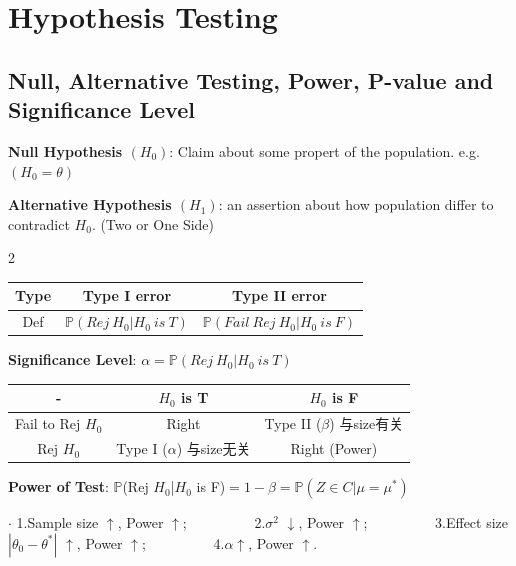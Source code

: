 \documentclass[9pt]{article}
\begin{document}
\section{Hypothesis Testing} %
\subsection{Null, Alternative Testing, Power, P-value and Significance Level}

\textbf{Null Hypothesis $(H_0)$}: Claim about some propert of the population. e.g. $(H_0=\theta)$

\textbf{Alternative Hypothesis $(H_1)$}: an assertion about how population differ to contradict $H_0$. (Two or One Side)

\vspace{-0.4cm}
\begin{multicols}{2}
    \begin{tabular}{|c|c|c|}
        \hline
        Type & Type I error                         & Type II error                               \\
        \hline
        Def  & $\mathbb{P}(Rej \ H_0|H_0 \ is \ T)$ & $\mathbb{P}(Fail \ Rej \ H_0|H_0 \ is \ F)$ \\
        \hline
    \end{tabular}

    \textbf{Significance Level}: $\alpha = \mathbb{P}(Rej \ H_0|H_0 \ is \ T)$

    \columnbreak

    \begin{tabular}{|c|c|c|}
        \hline
        -                 & $H_0$ is T                                 & $H_0$ is F                                \\
        \hline
        Fail to Rej $H_0$ & Right                                      & {\footnotesize Type II ($\beta$) 与size有关} \\
        \hline
        Rej $H_0$         & {\footnotesize Type I ($\alpha $) 与size无关} & Right (Power)                             \\
        \hline
    \end{tabular}

\end{multicols}
\vspace{-0.4cm}

\textbf{Power of Test}: $\mathbb{P}$(Rej $H_0$|$H_0$ is F)$=1-\beta=\mathbb{P}(Z\in C|\mu=\mu^*)$

$\cdot$ 1.Sample size $\uparrow$, Power $\uparrow$; \ \ \ \ \ \ \ \ \ 2.$\sigma^2$ $\downarrow$, Power $\uparrow$; \ \ \ \ \ \ \ \ \ 3.Effect size $|\theta_0-\theta^*|$ $\uparrow$, Power $\uparrow$; \ \ \ \ \ \ \ \ \ 4.$\alpha$$\uparrow$, Power $\uparrow$.
\end{document}
